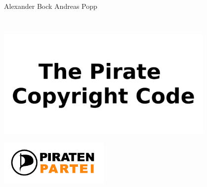\makeatletter
\begin{titlepage}

\begin{center}\sffamily\Large
Alexander Bock \hspace{\fill} Andreas Popp\\[1.5ex]
\end{center}


\vfill\ \vfill

\begin{center}
	\includegraphics[width=0.80\textwidth]{input_title.pdf}
\end{center}
\vfill

\begin{center}
	\texttt{\WCPRVersion}
\end{center}

\vfill

\begin{flushleft}
	\includegraphics[width=0.4\textwidth]{Logo_print_single.pdf}
\end{flushleft}



\end{titlepage}
\makeatother